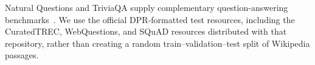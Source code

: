 Natural Questions and TriviaQA supply complementary question-answering benchmarks~\cite{nq,trivia}. We use the official DPR-formatted test resources, including the CuratedTREC, WebQuestions, and SQuAD resources distributed with that repository, rather than creating a random train--validation--test split of Wikipedia passages.
